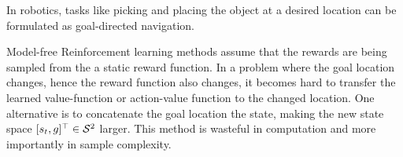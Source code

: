In robotics, tasks like picking and placing the object at a desired
location can be formulated as goal-directed navigation.

Model-free Reinforcement learning methods assume that the rewards are
being sampled from the a static reward function.  In a problem where the
goal location changes, hence the reward function also changes, it
becomes hard to transfer the learned value-function or action-value
function to the changed location.  One alternative is to concatenate the
goal location the state, making the new state space $[s_t,
g]^\top \in \mathcal{S}^2$ larger.  This method is wasteful in
computation and more importantly in sample complexity.

